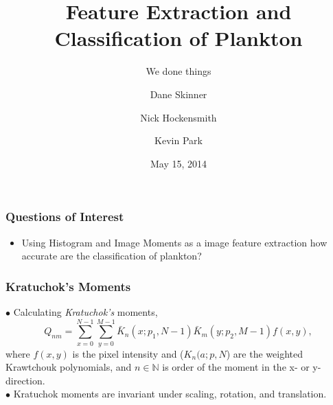 \documentclass{beamer}
\title 
{Feature Extraction and Classification of Plankton}
\subtitle
{ We done things }
\author{Dane Skinner \and Nick Hockensmith \and Kevin Park}
\institute
{Oregon State University}
\date
{May 15, 2014}
\begin{document}
\begin{frame}
	\maketitle
\end{frame}


\begin{frame}
\frametitle{Questions of Interest}
\begin{itemize}
	\item Using Histogram and Image Moments as a image feature extraction how accurate are the classification of plankton?
\end{itemize}

\end{frame}


\begin{frame}
\frametitle{Kratuchok's Moments}
$\bullet$ Calculating \textit{Kratuchok's} moments,
\begin{equation*}
Q_{nm} = \sum_{x=0}^{N-1}\sum_{y=0}^{M-1}\bar{K}_n(x;p_1,N-1)\bar{K}_m(y;p_2,M-1)f(x,y),
\end{equation*}
where  $f(x,y)$ is the pixel intensity and ($K_n(a;p,N$) are the weighted Krawtchouk polynomials, and $n\in \mathbb{N}$ is order of the moment in the x- or y-direction.\\
$\bullet$ Kratuchok moments are invariant under scaling, rotation, and translation. \\
\end{frame}

\end{document}
